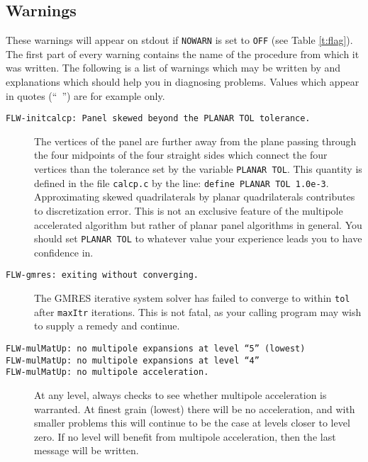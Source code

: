 \subsection{Warnings}
\label{ss:warn}

These warnings will appear on stdout if {\tt NOWARN} 
is set to {\tt OFF} (see Table \ref{t:flag}).  The first part of every 
warning contains the name of the procedure from which it was 
written.  The following is a list of warnings which may be
written by \fas and explanations which should help you in diagnosing
problems.  Values which appear in quotes (``\ '') are for example only.

\begin{description}

\item[{\tt FLW-initcalcp: Panel skewed beyond the PLANAR TOL tolerance.}]
The vertices of the panel are further away from the plane passing through 
the four midpoints of the four straight sides which connect the four
vertices than the tolerance set by the variable 
{\tt PLANAR TOL}.
This quantity is defined in the file {\tt calcp.c} by the line: 
{\tt define PLANAR TOL 1.0e-3}.  Approximating skewed quadrilaterals 
by planar quadrilaterals contributes to discretization error.  This is 
not an exclusive feature of the multipole accelerated algorithm but 
rather of planar panel algorithms in general.  You 
should set {\tt PLANAR TOL} to whatever value your experience leads 
you to have confidence in.

\item[{\tt FLW-gmres: exiting without converging.}]
The GMRES iterative system solver has failed to converge to within
{\tt tol} after {\tt maxItr} iterations.  This is not fatal, as your
calling program may wish to supply a remedy and continue.

\item[{\tt FLW-mulMatUp: no multipole expansions at level ``5'' (lowest)}]
\item[{\tt FLW-mulMatUp: no multipole expansions at level ``4''}]
\item[{\tt FLW-mulMatUp: no multipole acceleration.}]

At any level, \fas always checks to see whether multipole acceleration
is warranted.  At finest grain (lowest) there will be no acceleration, 
and with smaller problems this will continue to be the case at levels closer 
to level zero.  If no level will benefit from multipole acceleration, then
the last message will be written.


\end{description}
